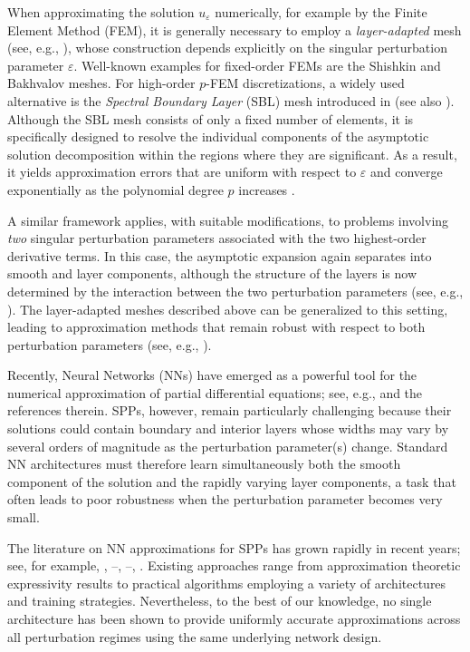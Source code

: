 \documentclass[11pt]{article}
\providecommand{\e}{\varepsilon}
\theoremstyle{plain}
\theoremstyle{definition}
\theoremstyle{remark}
\numberwithin{equation}{section}
\begin{document}
When approximating the solution $u_\e$ numerically, for example by the Finite Element Method (FEM), it is generally necessary to employ a \emph{layer-adapted} mesh (see, e.g., \cite{L}), whose construction depends explicitly on the singular perturbation parameter $\e$. Well-known examples for fixed-order FEMs are the Shishkin \cite{Shishkin2} and Bakhvalov \cite{B} meshes. For high-order $p$-FEM discretizations, a widely used alternative is the \emph{Spectral Boundary Layer} (SBL) mesh introduced in \cite{MXO} (see also \cite{SS}). Although the SBL mesh consists of only a fixed number of elements, it is specifically designed to resolve the individual components of the asymptotic solution decomposition within the regions where they are significant. As a result, it yields approximation errors that are uniform with respect to $\e$ and converge exponentially as the polynomial degree $p$ increases \cite{melenk}.

A similar framework applies, with suitable modifications, to problems involving \emph{two} singular perturbation parameters associated with the two highest-order derivative terms. In this case, the asymptotic expansion again separates into smooth and layer components, although the structure of the layers is now determined by the interaction between the two perturbation parameters (see, e.g., \cite{SX}). The layer-adapted meshes described above can be generalized to this setting, leading to approximation methods that remain robust with respect to both perturbation parameters (see, e.g., \cite{Irene}).


Recently, Neural Networks (NNs) have emerged as a powerful tool for the numerical approximation of partial differential equations; see, e.g., \cite{Huang} and the references therein. SPPs, however, remain particularly challenging because their solutions could contain boundary and interior layers whose widths may vary by several orders of magnitude as the perturbation parameter(s) change. Standard NN architectures must therefore learn simultaneously both the smooth component of the solution and the rapidly varying layer components, a task that often leads to poor robustness when the perturbation parameter becomes very small.

The literature on NN approximations for SPPs has grown rapidly in recent years; see, for example, \cite{AD, ACD}, \cite{BEFFM}--\cite{CGGY}, \cite{WY}--\cite{Xu}, \cite{OSX, OPS, XS}. Existing approaches range from approximation theoretic expressivity results to practical algorithms employing a variety of architectures and training strategies. Nevertheless, to the best of our knowledge, no single architecture has been shown to provide uniformly accurate approximations across all perturbation regimes using the same underlying network design.
\end{document}
